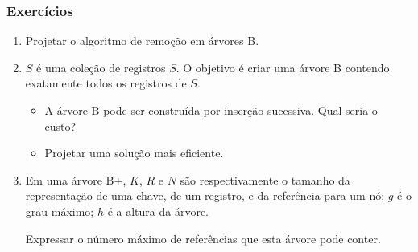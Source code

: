 \documentclass{beamer}
\begin{document}
\begin{frame}

\frametitle{Exercícios}

\begin{enumerate}

\item Projetar o algoritmo de remoção em árvores B.
\item $S$ é uma coleção de registros $S$. O objetivo é criar uma árvore B
  contendo exatamente todos os registros de $S$.
\begin{itemize}
\item A árvore B pode ser construída por inserção sucessiva. Qual seria o custo?
\item Projetar uma solução mais eficiente.
\end{itemize}
\item Em uma árvore B+, $K$, $R$ e $N$ são respectivamente o tamanho da
  representação de uma chave, de um registro, e da referência para um nó; $g$ é
  o grau máximo; $h$ é a altura da árvore.

  Expressar o número máximo de referências que esta árvore pode conter.
\end{enumerate}
\end{frame}
\end{document}
